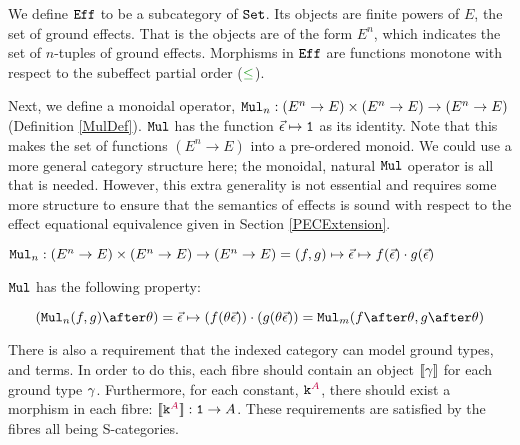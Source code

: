 \documentclass{Report}
\begin{document}
\begin{framed}
    
    \begin{definition}
        \label{EffDefinition}
        We define $\texttt{Eff}$ to be a subcategory of $\texttt{Set}$. Its objects are finite powers of $E$, the set of ground effects. That is the objects are of the form $E^n$, which indicates the set of $n$-tuples of ground effects. Morphisms in $\texttt{Eff}$ are functions monotone with respect to the subeffect partial order ($\subeffect$).
    \end{definition}
\end{framed}

Next, we define a monoidal operator, $\texttt{Mul}_n: (E^n \rightarrow E)\times (E^n \rightarrow E) \rightarrow (E^n \rightarrow E)$ (Definition \ref{MulDef}). $\texttt{Mul}$ has the function $\vec{\epsilon}\mapsto \texttt{1}$ as its identity. Note that this makes the set of functions $(E^n \rightarrow E)$ into a pre-ordered monoid. We could use a more general category structure here; the monoidal, natural $\texttt{Mul}$ operator is all that is needed. However, this extra generality is not essential and requires some more structure to ensure that the semantics of effects is sound with respect to the effect equational equivalence given in Section \ref{PECExtension}.



\begin{framed}
    \begin{definition}\label{MulDef}
        $\texttt{Mul}_n: (E^n \rightarrow E)\times (E^n \rightarrow E) \rightarrow (E^n \rightarrow E) = (f, g)\mapsto \vec{\epsilon}\mapsto f(\vec{\epsilon})\cdot g(\vec{\epsilon})$
    \end{definition}
    
    \begin{definition}[Naturality]\label{MulNaturality}
        $\texttt{Mul}$ has the following property:

        \begin{equation*}
            (\Mul_n(f, g)\after \theta) = \ev\mapsto(f(\theta \ev))\dot(g(\theta\ev)) = \Mul_m(f\after\theta, g\after\theta)
        \end{equation*}
    \end{definition}
\end{framed}

There is also a requirement that the indexed category can model ground types, and terms. In order to do this,  each fibre should contain an object ${\bf [\![}\gamma{\bf ]\!]}$ for each ground type $\gamma$. Furthermore, for each constant, $\texttt{k}^{\color{purple} A}$, there should exist a morphism in each fibre: ${\bf [\![}\texttt{k}^{\color{purple} A}{\bf ]\!]}: \texttt{1} \rightarrow A$. These requirements are satisfied by the fibres all being S-categories.
\end{document}
